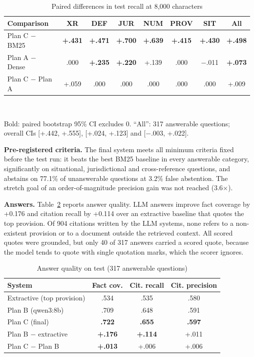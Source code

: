 \documentclass[conference]{IEEEtran}
\newcommand{\sig}[1]{\textbf{#1}}
\begin{document}
\begin{table}[t]
\caption{Paired differences in test recall at 8,000 characters}
\label{tab:paired}
\centering
\footnotesize
\setlength{\tabcolsep}{2.6pt}
\begin{tabular}{@{}lccccccc@{}}
\toprule
Comparison & XR & DEF & JUR & NUM & PROV & SIT & All \\
\midrule
Plan C $-$ BM25 & \sig{+.431} & \sig{+.471} & \sig{+.700} & \sig{+.639} & \sig{+.415} & \sig{+.430} & \sig{+.498} \\
Plan A $-$ Dense & .000 & \sig{+.235} & \sig{+.220} & +.139 & .000 & $-$.011 & \sig{+.073} \\
Plan C $-$ Plan A & +.059 & .000 & .000 & .000 & .000 & .000 & +.009 \\
\bottomrule
\end{tabular}
\\[2pt]
\raggedright\scriptsize Bold: paired bootstrap 95\% CI excludes 0. ``All'': 317 answerable questions; overall CIs
[+.442, +.555], [+.024, +.123] and [$-$.003, +.022].
\end{table}

\textbf{Pre-registered criteria.} The final system meets all minimum criteria fixed before the test run: it beats
the best BM25 baseline in every answerable category, significantly on situational, jurisdictional and
cross-reference questions, and abstains on 77.1\% of unanswerable questions at 3.2\% false abstention. The stretch
goal of an order-of-magnitude precision gain was not reached (3.6$\times$).

\textbf{Answers.} Table~\ref{tab:answers} reports answer quality. LLM answers improve fact coverage by +0.176 and
citation recall by +0.114 over an extractive baseline that quotes the top provision. Of 904 citations written by
the LLM systems, none refers to a non-existent provision or to a document outside the retrieved context. All
scored quotes were grounded, but only 40 of 317 answers carried a scored quote, because the model tends to quote
with single quotation marks, which the scorer ignores.

\begin{table}[t]
\caption{Answer quality on test (317 answerable questions)}
\label{tab:answers}
\centering
\footnotesize
\begin{tabular}{@{}lccc@{}}
\toprule
System & Fact cov. & Cit. recall & Cit. precision \\
\midrule
Extractive (top provision) & .534 & .535 & .580 \\
Plan B (qwen3:8b) & .709 & .648 & .591 \\
Plan C (final) & \sig{.722} & \sig{.655} & \sig{.597} \\
\midrule
Plan B $-$ extractive & \sig{+.176} & \sig{+.114} & +.011 \\
Plan C $-$ Plan B & \sig{+.013} & +.006 & +.006 \\
\bottomrule
\end{tabular}
\end{table}
\end{document}
